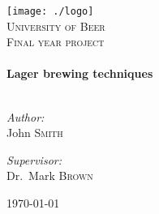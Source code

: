 \begin{titlepage}

\begin{center}

\texttt{[image: ./logo]}\\[1cm]    

\textsc{\LARGE University of Beer}\\[1.5cm]

\textsc{\Large Final year project}\\[0.5cm]

\HRule \\[0.4cm]
{ \huge \bfseries Lager brewing techniques}\\[0.4cm]

\HRule \\[1.5cm]

\begin{minipage}{0.4\textwidth}
\begin{flushleft} \large
\emph{Author:}\\
John \textsc{Smith}
\end{flushleft}
\end{minipage}
\begin{minipage}{0.4\textwidth}
\begin{flushright} \large
\emph{Supervisor:} \\
Dr.~Mark \textsc{Brown}
\end{flushright}
\end{minipage}

\vfill

{\large \today}

\end{center}

\end{titlepage}